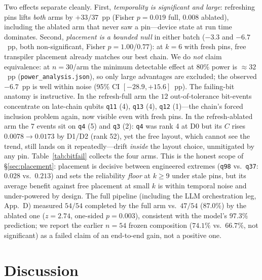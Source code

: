 \documentclass[journal,10pt,twocolumn]{IEEEtran}
\newcommand{\q}[1]{\texttt{q#1}}
\begin{document}
Two effects separate cleanly. First, \emph{temporality is significant and large}: refreshing pins lifts
\emph{both} arms by $+33/37$~pp (Fisher $p{=}0.019$ full, $0.008$ ablated), including the ablated arm that never
saw a pin---device state at run time dominates. Second, \emph{placement is a bounded null} in either batch
($-3.3$ and $-6.7$~pp, both non-significant, Fisher $p{=}1.00$/$0.77$): at $k{=}6$ with fresh pins, free
transpiler placement already matches our best chain. We do \emph{not} claim equivalence: at $n{=}30$/arm the
minimum detectable effect at $80\%$ power is $\approx32$~pp (\texttt{power\_analysis.json}), so only large
advantages are excluded; the observed $-6.7$~pp is well within noise (95\% CI $[-28.9, +15.6]$~pp). The failing-bit
anatomy is instructive. In the refresh-full arm the $12$ out-of-tolerance bit-events concentrate on late-chain
qubits \q{11} (4), \q{13} (4), \q{12} (1)---the chain's forced inclusion problem again, now visible even with fresh
pins. In the refresh-ablated arm the $7$ events sit on \q{4} (5) and \q{3} (2): \q{4} was rank 4 at D0 but its $C$
rises $0.0078\to0.0173$ by D1/D2 (rank 52), yet the free layout, which cannot see the trend, still lands on it
repeatedly---drift \emph{inside} the layout choice, unmitigated by any pin. Table~\ref{tab:bitfail} collects the
four arms. This is the honest scope of \S\ref{sec:placement}: placement is decisive between engineered extremes
(\q{98} vs.\ \q{37}: $0.028$ vs.\ $0.213$) and sets the reliability \emph{floor} at $k\ge9$ under stale pins, but
its average benefit against free placement at small $k$ is within temporal noise and under-powered by design.
The full pipeline (including the LLM orchestration leg, App.~D) measured $54/54$ completed by the full arm vs.\
$47/54$ ($87.0\%$) by the ablated one ($z{=}2.74$, one-sided $p{=}0.003$), consistent with the model's $97.3\%$
prediction; we report the earlier $n{=}54$ frozen composition ($74.1\%$ vs.\ $66.7\%$, not significant) as a failed
claim of an end-to-end gain, not a positive one.

\section{Discussion}
\label{sec:discussion}
\end{document}
